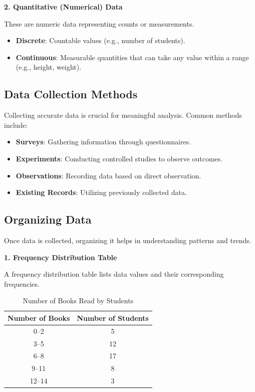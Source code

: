 \documentclass[twoside]{book}
\begin{document}
\textbf{2. Quantitative (Numerical) Data}

These are numeric data representing counts or measurements.

\begin{itemize}
    \item \textbf{Discrete}: Countable values (e.g., number of students).
    \item \textbf{Continuous}: Measurable quantities that can take any value within a range (e.g., height, weight).
\end{itemize}

\subsection{Data Collection Methods}

Collecting accurate data is crucial for meaningful analysis. Common methods include:

\begin{itemize}
    \item \textbf{Surveys}: Gathering information through questionnaires.
    \item \textbf{Experiments}: Conducting controlled studies to observe outcomes.
    \item \textbf{Observations}: Recording data based on direct observation.
    \item \textbf{Existing Records}: Utilizing previously collected data.
\end{itemize}

\subsection{Organizing Data}

Once data is collected, organizing it helps in understanding patterns and trends.

\textbf{1. Frequency Distribution Table}

A frequency distribution table lists data values and their corresponding frequencies.

\begin{table}[h]
\centering
\begin{tabular}{c|c}
\hline
\textbf{Number of Books} & \textbf{Number of Students} \\
\hline
0--2 & 5 \\
3--5 & 12 \\
6--8 & 17 \\
9--11 & 8 \\
12--14 & 3 \\
\hline
\end{tabular}
\caption{Number of Books Read by Students}
\end{table}
\end{document}
